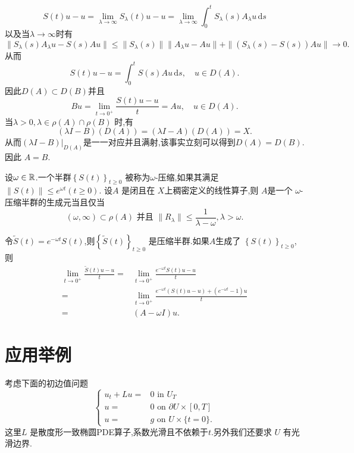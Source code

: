 \begin{enumerate}
\begin{equation}
      S(t)u-u=\lim_{\lambda\to \infty} S_\lambda(t)u-u=\lim_{\lambda\to \infty}\int_0^{t}S_\lambda(s)A_\lambda u\,\mathrm{d}s
    \end{equation}
    以及当$\lambda\to \infty$时有
    \[
      \|S_\lambda(s)A_\lambda u-S(s)A u\|\le \|S_\lambda(s)\|\|A_\lambda u -Au\|+\|(S_\lambda(s)-S(s))Au\|\to 0.
    \]
    从而
    \[
      S(t)u-u=\int_0^{t}S(s)Au\,\mathrm{d}s,\quad u\in D(A).
    \] 
    因此$D(A)\subset D(B)$并且
    \[
      Bu=\lim_{t\to 0^{+}}\frac{S(t)u-u}{t}=Au,\quad u\in D(A).
    \]
    当$\lambda>0,\lambda\in \rho(A)\cap \rho(B)$ 时,有
\[
      \left( \lambda I-B \right) (D(A))=\left( \lambda I-A \right) \left(D \left( A \right)  \right) =X.
  \] 
  从而$\left( \lambda I-B \right) |_{D(A)}$是一一对应并且满射,该事实立刻可以得到$D(A)=D(B)$.因此 $A=B$.
\end{enumerate}  

  \begin{theorem}
    设$\omega \in \mathbb{R}$.一个半群$\left\{S(t)\right\} _{t\ge 0}$ 被称为$\omega$-压缩,如果其满足$\|S(t)\|\le e^{\omega t}(t\ge 0)$. 设$A$ 是闭且在 $X$上稠密定义的线性算子,则 $A$是一个 $\omega$-压缩半群的生成元当且仅当
    \begin{equation}
      (\omega,\infty)\subset \rho(A) \text{ 并且 } \|R_\lambda\|\le \frac{1}{\lambda - \omega},\lambda>\omega.\label{15}
    \end{equation}
  \end{theorem}
  令$\widetilde{S}(t)=e^{-\omega t}S(t)$,则$\left\{\widetilde{S}(t)\right\}_{t\ge 0} $ 是压缩半群.如果$A$生成了 $\left\{S(t)\right\} _{t\ge 0}$,则
  \begin{align*}
  \lim_{t\to 0^{+}}\frac{\widetilde{S}(t)u-u}{t}=&\lim_{t\to 0^{+}} \frac{e^{-\omega t }S(t)u - u}{t} \\
  = & \lim_{t\to 0^{+}} \frac{e^{-\omega t}(S(t)u-u)+(e^{-\omega t}-1)u}{t}\\
  = & (A-\omega I)u
  .\end{align*}

\section{应用举例}
  考虑下面的初边值问题
  \begin{equation}
    \left\{
      \begin{aligned}
	u_t+Lu=&0   \text{ in }U_T\\
	u=&0 \text{ on  } \partial U\times [0,T]\\
	u=&g \text{ on }U\times\{t=0\}.
      \end{aligned}
    \right.
  \end{equation}
  这里$L$ 是散度形一致椭圆PDE算子,系数光滑且不依赖于$t$.另外我们还要求 $U$ 有光滑边界.
  

